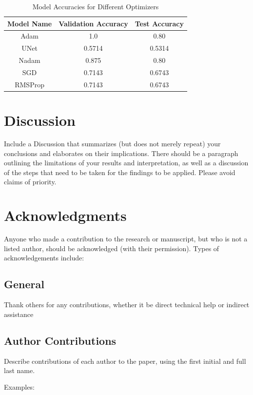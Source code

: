 \documentclass{article}
\begin{document}
\begin{table}[h]
    \caption{Model Accuracies for Different Optimizers}
    \centering
    \begin{tabular}{ccc}
        \hline
        \textbf{Model Name} & \textbf{Validation Accuracy} & \textbf{Test Accuracy} \\
        \hline
        Adam   & 1.0    & 0.80   \\
        UNet   & 0.5714 & 0.5314 \\
        Nadam  & 0.875  & 0.80   \\
        SGD    & 0.7143 & 0.6743 \\
        RMSProp & 0.7143 & 0.6743 \\
        \hline
    \end{tabular}
    \label{tab:accuracies}
\end{table}

\FloatBarrier
\section{Discussion}
Include a Discussion that summarizes (but does not merely repeat) your conclusions and elaborates on their implications. There should be a paragraph outlining the limitations of your results and interpretation, as well as a discussion of the steps that need to be taken for the findings to be applied. Please avoid claims of priority. 

\section*{Acknowledgments}
Anyone who made a contribution to the research or manuscript, but who is not a listed author, should be acknowledged (with their permission). Types of acknowledgements include:

\subsection*{General} 
Thank others for any contributions, whether it be direct technical help or indirect assistance 

\subsection*{Author Contributions} 
Describe contributions of each author to the paper, using the first initial and full last name. 

\medskip Examples:
\end{document}
